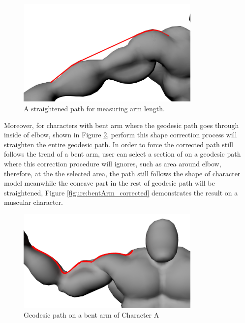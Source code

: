 \begin{figure}[H]
	\centering
	\includegraphics[width=0.8\textwidth]{../images/geodesic_image/arm_path_corrected}
	\caption{A straightened path for measuring arm length.}
	\label{figure:hulk_arm_strightened}
\end{figure}







Moreover, for characters with bent arm where the geodesic path goes through inside of elbow, shown in Figure \ref{figure:bentArm}, perform this shape correction process will straighten the entire geodesic path. In order to force the corrected path still follows the trend of a bent arm, user can select a section of on a geodesic path where this correction procedure will ignores, such as area around elbow, therefore, at the the selected area, the path still follows the shape of character model meanwhile the concave part in the rest of geodesic path will be straightened, Figure \ref{figure:bentArm_corrected} demonstrates the result on a muscular character.

\begin{figure}[H]
	\centering
	\includegraphics[width=0.8\textwidth]{../images/geodesic_image/bentArm}
	\caption{Geodesic path on a bent arm of Character A}
	\label{figure:bentArm}
\end{figure}

